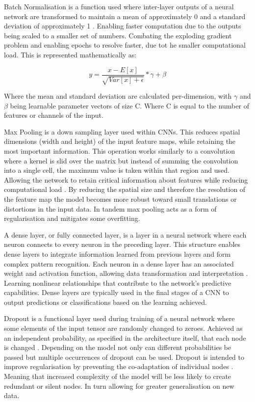 \documentclass[10pt,twocolumn,letterpaper]{article}
\begin{document}
Batch Normalisation is a function used where inter-layer outputs of a neural network are transformed to maintain a mean of approximately 0 and a standard deviation of approximately 1 \cite{pytorch}. Enabling faster computation due to the outputs being scaled to a smaller set of numbers. Combating the exploding gradient problem and enabling epochs to resolve faster, due tot he smaller computational load. This is represented mathematically as:

\[y = \frac{x-E[x]}{\sqrt{Var[x]+\epsilon}} * \gamma + \beta\]

Where the mean and standard deviation are calculated per-dimension, with \(\gamma\) and \(\beta\) being learnable parameter vectors of size C. Where C is equal to the number of features or channels of the input.

Max Pooling is a down sampling layer used within CNNs. This reduces spatial dimensions (width and height) of the input feature maps, while retaining the most important information. This operation works similarly to a convolution where a kernel is slid over the matrix but instead of summing the convolution into a single cell, the maximum value is taken within that region and used. Allowing the network to retain critical information about features while reducing computational load \cite{recent_trends}. By reducing the spatial size and therefore the resolution of the feature map the model becomes more robust toward small translations or distortions in the input data. In tandem max pooling acts as a form of regularisation and mitigates some overfitting. 

A dense layer, or fully connected layer, is a layer in a neural network where each neuron connects to every neuron in the preceding layer. This structure enables dense layers to integrate information learned from previous layers and form complex pattern recognition. Each neuron in a dense layer has an associated weight and activation function, allowing data transformation and interpretation \cite{pytorch}. Learning nonlinear relationships that contribute to the network's predictive capabilities. Dense layers are typically used in the final stages of a CNN to output predictions or classifications based on the learning achieved. 

Dropout is a functional layer used during training of a neural network where some elements of the input tensor are randomly changed to zeroes. Achieved as an independent probability, as specified in the architecture itself, that each node is changed \cite{pytorch}. Depending on the model not only can different probabilities be passed but multiple occurrences of dropout can be used. Dropout is intended to improve regularisation by preventing the co-adaptation of individual nodes \cite{hinton2012improvingneuralnetworkspreventing}. Meaning that increased complexity of the model will be less likely to create redundant or silent nodes. In turn allowing for greater generalisation on new data. 
\end{document}
